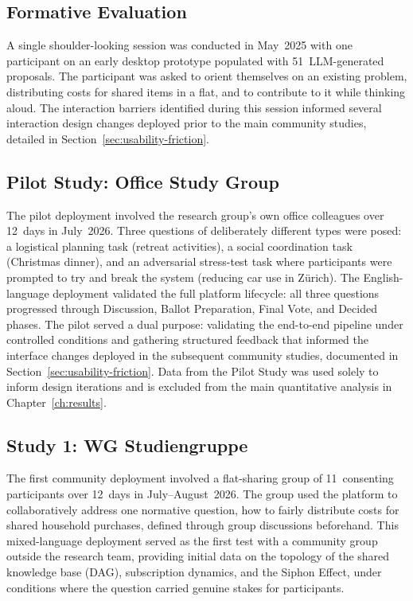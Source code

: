 \documentclass[a4paper, 12pt, twoside]{iviathesis}
\begin{document}
\subsection{Formative Evaluation}
\label{sec:formative-eval}
A single shoulder-looking session was conducted in May~2025 with one participant on an early desktop prototype populated with 51~LLM-generated proposals. The participant was asked to orient themselves on an existing problem, distributing costs for shared items in a flat, and to contribute to it while thinking aloud. The interaction barriers identified during this session informed several interaction design changes deployed prior to the main community studies, detailed in Section~\ref{sec:usability-friction}.

\subsection{Pilot Study: Office Study Group}
\label{sec:pilot-study}
The pilot deployment involved the research group's own office colleagues over 12~days in July~2026. Three questions of deliberately different types were posed: a logistical planning task (retreat activities), a social coordination task (Christmas dinner), and an adversarial stress-test task where participants were prompted to try and break the system (reducing car use in Z\"urich). The English-language deployment validated the full platform lifecycle: all three questions progressed through Discussion, Ballot Preparation, Final Vote, and Decided phases. The pilot served a dual purpose: validating the end-to-end pipeline under controlled conditions and gathering structured feedback that informed the interface changes deployed in the subsequent community studies, documented in Section~\ref{sec:usability-friction}. Data from the Pilot Study was used solely to inform design iterations and is excluded from the main quantitative analysis in Chapter~\ref{ch:results}.

\subsection{Study 1: WG Studiengruppe}
\label{sec:study-wg-studi}
The first community deployment involved a flat-sharing group of 11~consenting participants over 12~days in July--August~2026. The group used the platform to collaboratively address one normative question, how to fairly distribute costs for shared household purchases, defined through group discussions beforehand. This mixed-language deployment served as the first test with a community group outside the research team, providing initial data on the topology of the shared knowledge base (DAG), subscription dynamics, and the Siphon Effect, under conditions where the question carried genuine stakes for participants.
\end{document}
